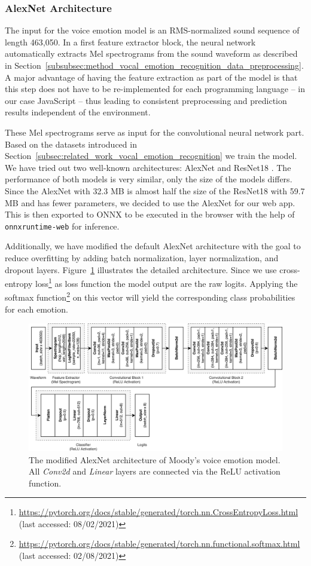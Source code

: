 \subsubsection{AlexNet Architecture}
\label{subsubsec:method_vocal_emotion_recognition_alexnet_architecture}
The input for the voice emotion model is an RMS-normalized sound sequence of length 463,050. In a first feature extractor block, the neural network automatically extracts Mel spectrograms from the sound waveform as described in Section~\ref{subsubsec:method_vocal_emotion_recognition_data_preprocessing}. A major advantage of having the feature extraction as part of the model is that this step does not have to be re-implemented for each programming language -- in our case JavaScript -- thus leading to consistent preprocessing and prediction results independent of the environment.

These Mel spectrograms serve as input for the convolutional neural network part. Based on the datasets introduced in Section~\ref{subsec:related_work_vocal_emotion_recognition} we train the model. We have tried out two well-known architectures: AlexNet and ResNet18 \cite{krizhevsky_imagenet_2012,he_deep_2015}. The performance of both models is very similar, only the size of the models differs. Since the AlexNet with 32.3 MB is almost half the size of the ResNet18 with 59.7 MB and has fewer parameters, we decided to use the AlexNet for our web app. This is then exported to ONNX to be executed in the browser with the help of \texttt{onnxruntime-web} for inference.

Additionally, we have modified the default AlexNet architecture with the goal to reduce overfitting by adding batch normalization, layer normalization, and dropout layers. Figure~\ref{fig:alexnet_architecture} illustrates the detailed architecture. Since we use cross-entropy loss\footnote{\url{https://pytorch.org/docs/stable/generated/torch.nn.CrossEntropyLoss.html} (last accessed: 08/02/2021)} as loss function the model output are the raw logits. Applying the softmax function\footnote{\url{https://pytorch.org/docs/stable/generated/torch.nn.functional.softmax.html} (last accessed: 02/08/2021)} on this vector will yield the corresponding class probabilities for each emotion.

\begin{figure}
    \centering
    \includegraphics[width=\textwidth]{assets/alexnet_architecture.png}
    \caption{The modified AlexNet architecture of Moody's voice emotion model. All \emph{Conv2d} and \emph{Linear} layers are connected via the ReLU activation function.}
    \label{fig:alexnet_architecture}
\end{figure}